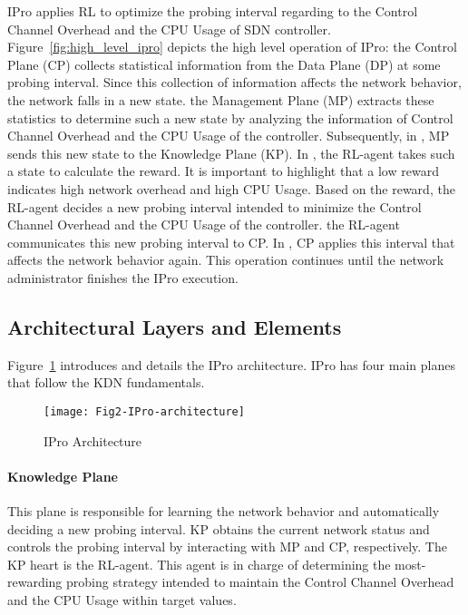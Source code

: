 IPro applies RL to optimize the probing interval regarding to the Control Channel Overhead and the CPU Usage of SDN controller. Figure~\ref{fig:high_level_ipro} depicts the high level operation of IPro:  the Control Plane (CP) collects statistical information from the Data Plane (DP) at some probing interval. Since this collection of information affects the network behavior, the network falls in a new state.  the Management Plane (MP) extracts these statistics to determine such a new state by analyzing the information of Control Channel Overhead and the CPU Usage of the controller. Subsequently, in , MP sends this new state to the Knowledge Plane (KP). In , the RL-agent takes such a state to calculate the reward. It is important to highlight that a low reward indicates high network overhead and high CPU Usage. Based on the reward, the RL-agent decides a new probing interval intended to minimize the Control Channel Overhead and the CPU Usage of the controller.  the RL-agent communicates this new probing interval to CP. In , CP applies this interval that affects the network behavior again. This operation continues until the network administrator finishes the IPro execution.

\subsection{Architectural Layers and Elements}
\label{subsec:detailed_architecture}
Figure~\ref{fig:detail_ipro} introduces and details the IPro architecture.  IPro has four main planes that follow the KDN fundamentals.

\begin{figure}[h!]
    \centering
    \texttt{[image: Fig2-IPro-architecture]}
    \caption{IPro Architecture}
    \label{fig:detail_ipro}
\end{figure}

\paragraph{\textbf{Knowledge Plane}} 
This plane is responsible for learning the network behavior and automatically deciding a new probing interval. KP obtains the current network status and controls the probing interval by interacting with MP and CP, respectively. The KP heart is the RL-agent. This agent is in charge of determining the most-rewarding probing strategy intended to maintain the Control Channel Overhead and the CPU Usage within target values.

